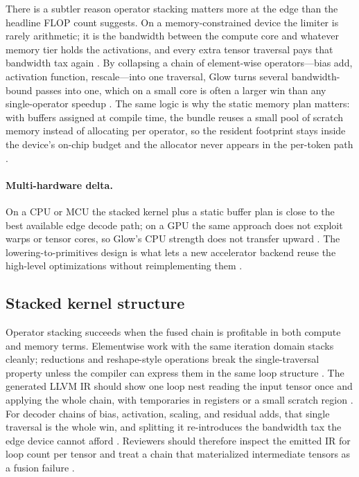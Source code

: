There is a subtler reason operator stacking matters more at the edge than the headline FLOP count suggests. On a memory-constrained device the limiter is rarely arithmetic; it is the bandwidth between the compute core and whatever memory tier holds the activations, and every extra tensor traversal pays that bandwidth tax again \citep{taxbreak2026,memoryfloor2026}. By collapsing a chain of element-wise operators---bias add, activation function, rescale---into one traversal, Glow turns several bandwidth-bound passes into one, which on a small core is often a larger win than any single-operator speedup \citep{rotem2018glow}. The same logic is why the static memory plan matters: with buffers assigned at compile time, the bundle reuses a small pool of scratch memory instead of allocating per operator, so the resident footprint stays inside the device's on-chip budget and the allocator never appears in the per-token path \citep{dlbook,patel2025llminference}.

\paragraph{Multi-hardware delta.} On a CPU or MCU the stacked kernel plus a static buffer plan is close to the best available edge decode path; on a GPU the same approach does not exploit warps or tensor cores, so Glow's CPU strength does not transfer upward \citep{nvidia2022hopper,semianalysis2024tma}. The lowering-to-primitives design is what lets a new accelerator backend reuse the high-level optimizations without reimplementing them \citep{amd2024aie}.

\subsection{Stacked kernel structure}

Operator stacking succeeds when the fused chain is profitable in both compute and memory terms. Elementwise work with the same iteration domain stacks cleanly; reductions and reshape-style operations break the single-traversal property unless the compiler can express them in the same loop structure \citep{rotem2018glow,memoryfloor2026}. The generated LLVM IR should show one loop nest reading the input tensor once and applying the whole chain, with temporaries in registers or a small scratch region \citep{pytorchglow2024,taxbreak2026}. For decoder chains of bias, activation, scaling, and residual adds, that single traversal is the whole win, and splitting it re-introduces the bandwidth tax the edge device cannot afford \citep{dao2022flashattention,memoryfloor2026}. Reviewers should therefore inspect the emitted IR for loop count per tensor and treat a chain that materialized intermediate tensors as a fusion failure \citep{rotem2018glow,patel2025llminference}.

